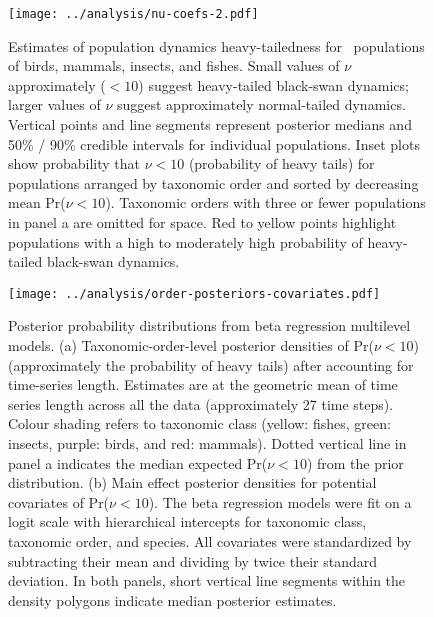 \clearpage

\begin{figure}[htbp]
\begin{center}
\texttt{[image: ../analysis/nu-coefs-2.pdf]}

\caption[Estimates of population dynamics heavy-tailedness for \nuCoefPopN\
  populations of birds, mammals, insects, and fishes.]{Estimates of population dynamics heavy-tailedness for \nuCoefPopN\
  populations of birds, mammals, insects, and fishes. Small values of $\nu$
  approximately ($< 10$) suggest heavy-tailed black-swan dynamics; larger values of
  $\nu$ suggest approximately normal-tailed dynamics. Vertical points and line
  segments represent posterior medians and 50\% / 90\% credible intervals for
  individual populations. Inset plots show probability that $\nu < 10$
  (probability of heavy tails) for populations arranged by taxonomic order and
  sorted by decreasing mean Pr($\nu < 10$). Taxonomic orders with three or
  fewer populations in panel a are omitted for space. Red to yellow points
  highlight populations with a high to moderately high probability of
  heavy-tailed black-swan dynamics.}

\label{fig:nu-coefs}
\end{center}
\end{figure}
\clearpage

\begin{figure}[htbp]
\begin{center}
\texttt{[image: ../analysis/order-posteriors-covariates.pdf]}

\caption[Posterior probability distributions from beta regression multilevel
  models.]{Posterior probability distributions from beta regression multilevel
  models. (a) Taxonomic-order-level posterior densities of Pr($\nu < 10$)
  (approximately the probability of heavy tails) after accounting for
  time-series length. Estimates are at the geometric mean of time series
  length across all the data (approximately 27 time steps). Colour shading
  refers to taxonomic class (yellow: fishes, green: insects, purple: birds,
  and red: mammals). Dotted vertical line in panel a indicates the median
  expected Pr($\nu < 10$) from the prior distribution. (b) Main effect
  posterior densities for potential covariates of Pr($\nu < 10$). The beta
  regression models were fit on a logit scale with hierarchical intercepts for
  taxonomic class, taxonomic order, and species. All covariates were
  standardized by subtracting their mean and dividing by twice their standard
  deviation. In both panels, short vertical line segments within the density
  polygons indicate median posterior estimates.}

\label{fig:posteriors}
\end{center}
\end{figure}

